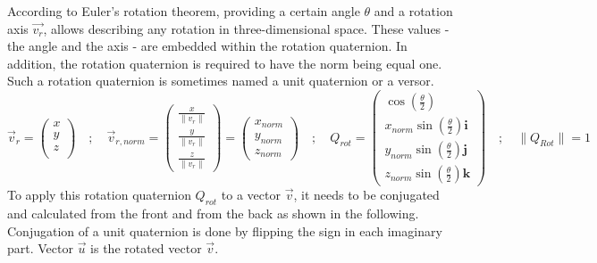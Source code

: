 According to Euler's rotation theorem, providing a certain angle $\theta$ and a rotation axis $\vec{v_{r}}$, allows describing any rotation in three-dimensional space.
These values - the angle and the axis - are embedded within the rotation quaternion. In addition, the rotation quaternion is required to have the norm being equal one. Such a rotation quaternion is sometimes named a unit quaternion or a versor.
\begin{equation*}
    \vec{v}_{r} =
    \begin{pmatrix}
        x \\
        y \\
        z \\
    \end{pmatrix}
    \quad ; \quad
    \vec{v}_{r,norm} =
    \begin{pmatrix}
        \frac{x}{\lVert v_{r} \rVert} \\
        \frac{y}{\lVert v_{r} \rVert} \\
        \frac{z}{\lVert v_{r} \rVert}
    \end{pmatrix} =
    \begin{pmatrix}
        x_{norm} \\
        y_{norm} \\
        z_{norm}
    \end{pmatrix}
    \quad ; \quad
    Q_{rot}=
    \begin{pmatrix}
        \cos (\frac{\theta}{2} )                 \\
        x_{norm}\sin(\frac{\theta}{2})\textbf{i} \\
        y_{norm}\sin(\frac{\theta}{2})\textbf{j} \\
        z_{norm}\sin(\frac{\theta}{2})\textbf{k}
    \end{pmatrix}
    \quad ; \quad
    \lVert Q_{Rot} \rVert = 1
\end{equation*}
To apply this rotation quaternion $Q_{rot}$ to a vector $\vec{v}$, it needs to be conjugated and calculated from the front and from the back as shown in the following. Conjugation of a unit quaternion is done by flipping the sign in each imaginary part. Vector $\vec{u}$ is the rotated vector $\vec{v}$.
